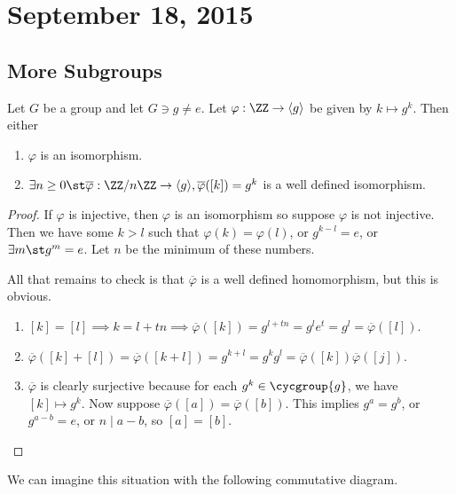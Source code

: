 \section{September 18, 2015}

\subsection{More Subgroups}

\begin{prop}
\label{homomorphismidea}
Let $G$ be a group and let $G \ni g \neq e$. Let $\varphi : \ZZ \to
\langle g \rangle$ be given by $k \mapsto g^k$. Then either
\begin{enumerate}
\item $\varphi$ is an isomorphism.
\item $\exists n \geq 0 \st \overline{\varphi} :  \ZZ / n \ZZ \to
\langle g \rangle, \overline{\varphi}([k]) = g^k$ is a well defined
isomorphism.
\end{enumerate}
\end{prop}

\begin{proof}
If $\varphi$ is injective, then $\varphi$ is an isomorphism so suppose
$\varphi$ is not injective. Then we have some $k > l$ such that
$\varphi(k) = \varphi(l)$, or $g^{k - l} = e$, or $\exists m \st g^m =
e$. Let $n$ be the minimum of these numbers.

All that remains to check is that $\overline{\varphi}$ is a well defined
homomorphism, but this is obvious.
\begin{enumerate}
\item $[k] = [l] \implies k = l + tn \implies \overline{\varphi}([k]) =
g^{l + tn} = g^l e^t = g^l = \overline{\varphi}([l])$.
\item $\overline{\varphi}([k] + [l]) = \overline{\varphi}([k + l]) =
g^{k + l} = g^k g^l = \overline{\varphi}([k]) \overline{\varphi}([j])$.
\item $\overline{\varphi}$ is clearly surjective because for each $g^k
\in \cycgroup{g}$, we have $[k] \mapsto g^k$. Now suppose
$\overline{\varphi}([a]) = \overline{\varphi}([b])$. This implies $g^a =
g^b$, or $g^{a - b} = e$, or $n \mid a - b$, so $[a] = [b]$.
\end{enumerate}
\end{proof}

\begin{rem}
We can imagine this situation with the following commutative diagram.
\begin{center}
\end{center}
\end{rem}

